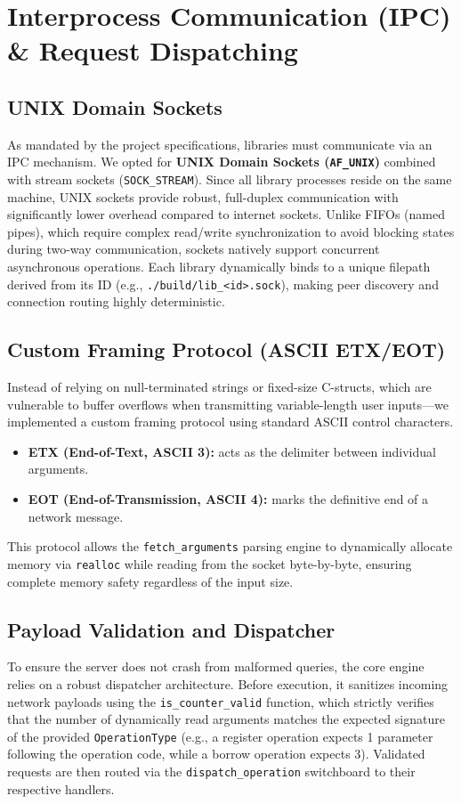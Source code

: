 \documentclass[11pt, a4paper]{article}
\begin{document}
\section{Interprocess Communication (IPC) \& Request Dispatching}
\subsection{UNIX Domain Sockets}
As mandated by the project specifications, libraries must communicate via an IPC mechanism. We opted for \textbf{UNIX Domain Sockets (\texttt{AF\_UNIX})} combined with stream sockets (\texttt{SOCK\_STREAM}). 
Since all library processes reside on the same machine, UNIX sockets provide robust, full-duplex communication with significantly lower overhead compared to internet sockets. Unlike FIFOs (named pipes), which require complex read/write synchronization to avoid blocking states during two-way communication, sockets natively support concurrent asynchronous operations. Each library dynamically binds to a unique filepath derived from its ID (e.g., \texttt{./build/lib\_<id>.sock}), making peer discovery and connection routing highly deterministic.

\subsection{Custom Framing Protocol (ASCII ETX/EOT)}
Instead of relying on null-terminated strings or fixed-size C-structs, which are vulnerable to buffer overflows when transmitting variable-length user inputs—we implemented a custom framing protocol using standard ASCII control characters.
\begin{itemize}[leftmargin=*]
    \item \textbf{ETX (End-of-Text, ASCII 3):} acts as the delimiter between individual arguments.
    \item \textbf{EOT (End-of-Transmission, ASCII 4):} marks the definitive end of a network message.
\end{itemize}
This protocol allows the \texttt{fetch\_arguments} parsing engine to dynamically allocate memory via \texttt{realloc} while reading from the socket byte-by-byte, ensuring complete memory safety regardless of the input size. 

\subsection{Payload Validation and Dispatcher}
To ensure the server does not crash from malformed queries, the core engine relies on a robust dispatcher architecture. Before execution, it sanitizes incoming network payloads using the \texttt{is\_counter\_valid} function, which strictly verifies that the number of dynamically read arguments matches the expected signature of the provided \texttt{OperationType} (e.g., a register operation expects 1 parameter following the operation code, while a borrow operation expects 3). Validated requests are then routed via the \texttt{dispatch\_operation} switchboard to their respective handlers.
\end{document}
